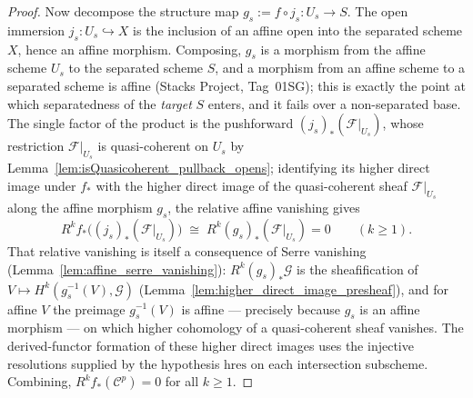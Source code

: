 \begin{proof}
  Now decompose the structure map \(g_s := f \circ j_s : U_s \to S\). The open
  immersion \(j_s : U_s \hookrightarrow X\) is the inclusion of an affine open into
  the separated scheme \(X\), hence an affine morphism. Composing, \(g_s\) is a
  morphism from the affine scheme \(U_s\) to the separated scheme \(S\), and a
  morphism from an affine scheme to a separated scheme is affine (Stacks Project,
  Tag~01SG); this is exactly the point at which separatedness of the \emph{target}
  \(S\) enters, and it fails over a non-separated base. The single factor of the
  product is the pushforward \((j_s)_*(\mathcal{F}|_{U_s})\), whose restriction
  \(\mathcal{F}|_{U_s}\) is quasi-coherent on \(U_s\) by
  Lemma~\ref{lem:isQuasicoherent_pullback_opens}; identifying its higher direct
  image under \(f_*\) with the higher direct image of the quasi-coherent sheaf
  \(\mathcal{F}|_{U_s}\) along the affine morphism \(g_s\), the relative affine
  vanishing gives
  \[
    R^k f_*\bigl((j_s)_*(\mathcal{F}|_{U_s})\bigr)
      \;\cong\;
    R^k (g_s)_*(\mathcal{F}|_{U_s}) = 0
      \qquad (k \geq 1).
  \]
  That relative vanishing is itself a consequence of Serre vanishing
  (Lemma~\ref{lem:affine_serre_vanishing}): \(R^k(g_s)_*\mathcal{G}\) is the
  sheafification of \(V \mapsto H^k(g_s^{-1}(V), \mathcal{G})\)
  (Lemma~\ref{lem:higher_direct_image_presheaf}), and for affine \(V\) the preimage
  \(g_s^{-1}(V)\) is affine --- precisely because \(g_s\) is an affine morphism ---
  on which higher cohomology of a quasi-coherent sheaf vanishes. The derived-functor
  formation of these higher direct images uses the injective resolutions supplied by
  the hypothesis \(\mathrm{hres}\) on each intersection subscheme. Combining,
  \(R^k f_*(\mathcal{C}^p) = 0\) for all \(k \geq 1\).
\end{proof}

